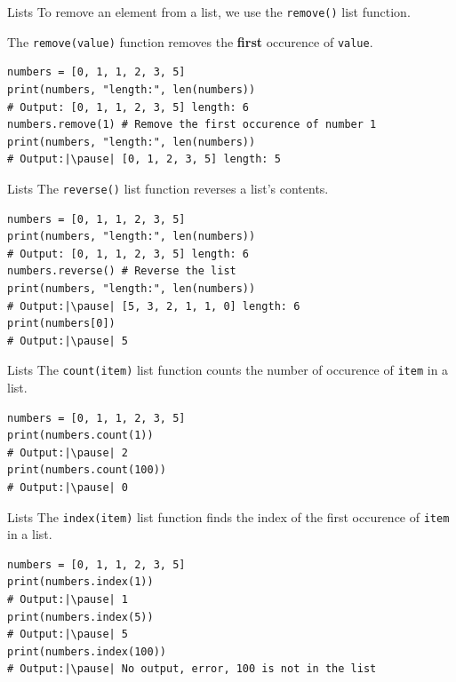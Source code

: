 \documentclass[dvipsnames, svgnames, x11names]{beamer}
\begin{document}
\begin{frame}[fragile]{Lists}
To remove an element from a list, we use the \texttt{remove()} list function.

The \texttt{remove(value)} function removes the \textbf{first} occurence of \texttt{value}. \pause
\begin{verbatim}
numbers = [0, 1, 1, 2, 3, 5]
print(numbers, "length:", len(numbers)) 
# Output: [0, 1, 1, 2, 3, 5] length: 6
numbers.remove(1) # Remove the first occurence of number 1
print(numbers, "length:", len(numbers))
# Output:|\pause| [0, 1, 2, 3, 5] length: 5
\end{verbatim}
\end{frame}

\begin{frame}[fragile]{Lists}
The \texttt{reverse()} list function reverses a list's contents. \pause

\begin{verbatim}
numbers = [0, 1, 1, 2, 3, 5]
print(numbers, "length:", len(numbers)) 
# Output: [0, 1, 1, 2, 3, 5] length: 6
numbers.reverse() # Reverse the list
print(numbers, "length:", len(numbers)) 
# Output:|\pause| [5, 3, 2, 1, 1, 0] length: 6
print(numbers[0])
# Output:|\pause| 5
\end{verbatim}
\end{frame}

\begin{frame}[fragile]{Lists}
The \texttt{count(item)} list function counts the number of occurence of \texttt{item} in a list. \pause

\begin{verbatim}
numbers = [0, 1, 1, 2, 3, 5]
print(numbers.count(1)) 
# Output:|\pause| 2
print(numbers.count(100)) 
# Output:|\pause| 0
\end{verbatim}
\end{frame}

\begin{frame}[fragile]{Lists}
The \texttt{index(item)} list function finds the index of the first occurence of \texttt{item} in a list. \pause

\begin{verbatim}
numbers = [0, 1, 1, 2, 3, 5]
print(numbers.index(1)) 
# Output:|\pause| 1
print(numbers.index(5)) 
# Output:|\pause| 5
print(numbers.index(100))
# Output:|\pause| No output, error, 100 is not in the list
\end{verbatim}
\end{frame}
\end{document}
